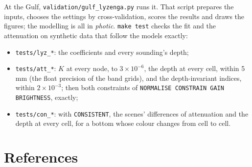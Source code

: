 \documentclass[11pt]{article}
\numberwithin{equation}{section}
\newcommand{\code}[1]{\texttt{#1}}
\begin{document}
At the Gulf, \code{validation/gulf\_lyzenga.py} runs it. That script prepares the inputs, chooses
the settings by cross-validation, scores the results and draws the figures; the modelling is all
in \textit{photic}. \code{make test} checks the fit and the attenuation on synthetic data that
follow the models exactly:
\begin{itemize}
\item \code{tests/lyz\_*}: the coefficients and every sounding's depth;
\item \code{tests/att\_*}: $K$ at every node, to $3\times10^{-6}$, the depth at every cell, within
  5\,mm (the float precision of the band grids), and the depth-invariant indices, within
  $2\times10^{-3}$; then both constraints of \code{NORMALISE CONSTRAIN GAIN BRIGHTNESS}, exactly;
\item \code{tests/con\_*}: with \code{CONSISTENT}, the scenes' differences of attenuation and the
  depth at every cell, for a bottom whose colour changes from cell to cell.
\end{itemize}

\section*{References}
\end{document}
